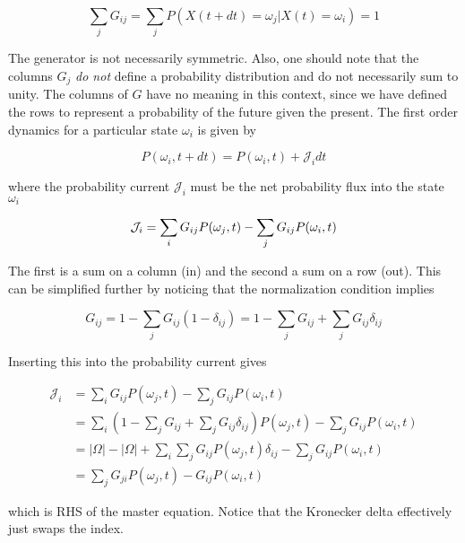 \documentclass{ucetd}
\begin{document}
\begin{equation*}
\sum_{j}G_{ij} = \sum_{j} P(X(t+dt) = \omega_{j} | X(t) = \omega_{i}) = 1
\end{equation*}

The generator is not necessarily symmetric. Also, one should note that the columns $G_{j}$ \emph{do not} define a probability distribution and do not necessarily sum to unity. The columns of $G$ have no meaning in this context, since we have defined the rows to represent a probability of the future given the present. The first order dynamics for a particular state $\omega_{i}$ is given by


\begin{equation*}
P(\omega_{i},t+dt) = P(\omega_{i},t) + \mathcal{J}_{i}dt
\end{equation*}

where the probability current $\mathcal{J}_{i}$ must be the net probability flux into the state $\omega_{i}$

\begin{equation*}
\mathcal{J}_{i} = \sum_{i}G_{ij}P(\omega_{j},t) - \sum_{j}G_{ij}P(\omega_{i},t)\\
\end{equation*}

The first is a sum on a column (in) and the second a sum on a row (out). This can be simplified further by noticing that the normalization condition implies

\begin{equation*}
G_{ij} = 1 - \sum_{j}G_{ij}(1-\delta_{ij}) = 1 - \sum_{j}G_{ij} + \sum_{j}G_{ij}\delta_{ij}
\end{equation*}

Inserting this into the probability current gives

\begin{align*}
\mathcal{J}_{i} &= \sum_{i}G_{ij}P(\omega_{j},t) - \sum_{j}G_{ij}P(\omega_{i},t)\\
&= \sum_{i}\left(1 - \sum_{j}G_{ij} + \sum_{j}G_{ij}\delta_{ij}\right)P(\omega_{j},t) - \sum_{j}G_{ij}P(\omega_{i},t)\\
&= |\Omega| - |\Omega| + \sum_{i}\sum_{j}G_{ij}P(\omega_{j},t)\delta_{ij} - \sum_{j}G_{ij}P(\omega_{i},t)\\
&= \sum_{j}G_{ji}P(\omega_{j},t) - G_{ij}P(\omega_{i},t)
\end{align*}

which is RHS of the master equation. Notice that the Kronecker delta effectively just swaps the index. 
\end{document}
